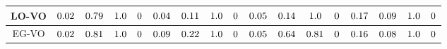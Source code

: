 \begin{table*}[t]
{\begin{tabular}{c|c|c|c|c|c|c|c|c|c|c|c|c|c|c|c|c}
\hline
\hline
LO-VO & $ \cellcolor{white!30} 0.02$ & $ \cellcolor{white!30} 0.79$ & $ \cellcolor{white!30} 1.0$ & $ \cellcolor{white!30} 0$ & $ \cellcolor{white!30} 0.04$ & $ \cellcolor{white!30} 0.11$ & $ \cellcolor{white!30} 1.0$ & $ \cellcolor{white!30} 0$ & $ \cellcolor{white!30} 0.05$ & $ \cellcolor{white!30} 0.14$ & $ \cellcolor{white!30} 1.0$ & $ \cellcolor{white!30} 0$ & $ \cellcolor{white!30} 0.17$  & $ \cellcolor{white!30} 0.09$ & $ \cellcolor{white!30} 1.0$ & $ \cellcolor{white!30} 0$\\
\hline
EG-VO \cite{jiang2021enlightengan} & $ \cellcolor{white!40} 0.02$ & $ \cellcolor{white!40} 0.81$ & $ \cellcolor{white!40} 1.0$ & $ \cellcolor{white!40} 0$ & $ \cellcolor{white!40} 0.09$ & $ \cellcolor{white!40} 0.22$ & $ \cellcolor{white!40} 1.0$ & $ \cellcolor{white!40} 0$ & $ \cellcolor{white!40} 0.05$ & $ \cellcolor{white!40} 0.64$ & $ \cellcolor{white!40} 0.81$ & $ \cellcolor{white!40} 0$ & $ \cellcolor{white!40} 0.16$  & $ \cellcolor{white!40} 0.08$ & $ \cellcolor{white!40} 1.0$ & $ \cellcolor{white!40} 0$\\
\hline
\hline
\end{tabular}}
\end{table*}